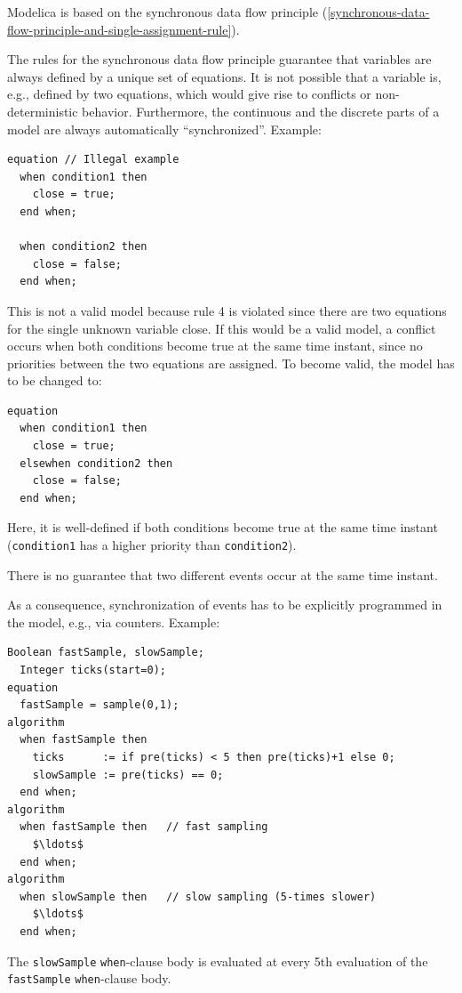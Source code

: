 Modelica is based on the synchronous data flow principle (\cref{synchronous-data-flow-principle-and-single-assignment-rule}).

\begin{nonnormative}
The rules for the synchronous data flow principle guarantee that variables are always defined by a unique set of equations.
It is not possible that a variable is, e.g., defined by two equations, which would give rise to conflicts or non-deterministic behavior.
Furthermore, the continuous and the discrete parts of a model are always automatically ``synchronized''.
Example:
\begin{lstlisting}[language=modelica]
equation // Illegal example
  when condition1 then
    close = true;
  end when;

  when condition2 then
    close = false;
  end when;
\end{lstlisting}

This is not a valid model because rule 4 is violated since there are two equations for the single unknown variable close.
If this would be a valid model, a conflict occurs when both conditions become true at the same time instant, since no priorities between the two equations are assigned.
To become valid, the model has to be changed to:
\begin{lstlisting}[language=modelica]
equation
  when condition1 then
    close = true;
  elsewhen condition2 then
    close = false;
  end when;
\end{lstlisting}

Here, it is well-defined if both conditions become true at the same time instant (\lstinline!condition1! has a higher priority than \lstinline!condition2!).
\end{nonnormative}

There is no guarantee that two different events occur at the same time instant.

\begin{nonnormative}
As a consequence, synchronization of events has to be explicitly programmed in the model, e.g., via counters.
Example:
\begin{lstlisting}[language=modelica]
  Boolean fastSample, slowSample;
  Integer ticks(start=0);
equation
  fastSample = sample(0,1);
algorithm
  when fastSample then
    ticks      := if pre(ticks) < 5 then pre(ticks)+1 else 0;
    slowSample := pre(ticks) == 0;
  end when;
algorithm
  when fastSample then   // fast sampling
    $\ldots$
  end when;
algorithm
  when slowSample then   // slow sampling (5-times slower)
    $\ldots$
  end when;
\end{lstlisting}

The \lstinline!slowSample! \lstinline!when!-clause body is evaluated at every 5th evaluation of the \lstinline!fastSample! \lstinline!when!-clause body.
\end{nonnormative}

